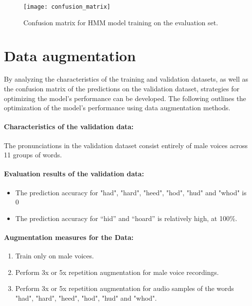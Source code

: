 \documentclass{article}
\begin{document}
\begin{figure}[!h]
\begin{center}
\texttt{[image: confusion\_matrix]}
\end{center}
\caption{\label{fig:confusion-matrix} Confusion matrix for HMM model training on the evaluation set.}
\end{figure}

\section{Data augmentation}

By analyzing the characteristics of the training and validation datasets, as well as the confusion matrix of the predictions on the validation dataset, strategies for optimizing the model’s performance can be developed. The following outlines the optimization of the model’s performance using data augmentation methods.

\paragraph{Characteristics of the validation data:}
The pronunciations in the validation dataset consist entirely of male voices across 11 groups of words.

\paragraph{Evaluation results of the validation data:}
\begin{itemize}
\item The prediction accuracy for "had", "hard", "heed", "hod", "hud" and "whod" is 0%
\item The prediction accuracy for “hid” and “hoard” is relatively high, at 100\%.	
\end{itemize}

\paragraph{Augmentation measures for the Data:}
\begin{enumerate}
\item Train only on male voices.
\item Perform 3x or 5x repetition augmentation for male voice recordings.
\item Perform 3x or 5x repetition augmentation for audio samples of the words "had", "hard", "heed", "hod", "hud" and "whod".
\end{enumerate}
\end{document}
